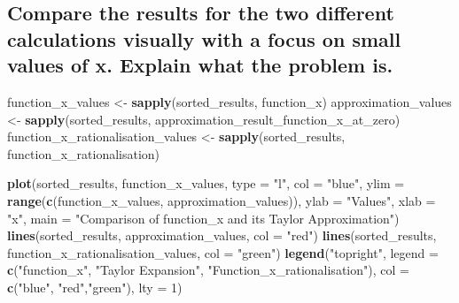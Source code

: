 \documentclass[
]{article}
\newenvironment{Shaded}{\begin{snugshade}}{\end{snugshade}}
\newcommand{\AttributeTok}[1]{\textcolor[rgb]{0.13,0.29,0.53}{#1}}
\newcommand{\DecValTok}[1]{\textcolor[rgb]{0.00,0.00,0.81}{#1}}
\newcommand{\FunctionTok}[1]{\textcolor[rgb]{0.13,0.29,0.53}{\textbf{#1}}}
\newcommand{\NormalTok}[1]{#1}
\newcommand{\OtherTok}[1]{\textcolor[rgb]{0.56,0.35,0.01}{#1}}
\newcommand{\StringTok}[1]{\textcolor[rgb]{0.31,0.60,0.02}{#1}}
\begin{document}
\subsection{Compare the results for the two different calculations
visually with a focus on small values of x. Explain what the problem
is.}\label{compare-the-results-for-the-two-different-calculations-visually-with-a-focus-on-small-values-of-x.-explain-what-the-problem-is.}

\begin{Shaded}
\begin{Highlighting}[]
\NormalTok{function\_x\_values }\OtherTok{\textless{}{-}} \FunctionTok{sapply}\NormalTok{(sorted\_results, function\_x)}
\NormalTok{approximation\_values }\OtherTok{\textless{}{-}} \FunctionTok{sapply}\NormalTok{(sorted\_results, approximation\_result\_function\_x\_at\_zero)}
\NormalTok{function\_x\_rationalisation\_values }\OtherTok{\textless{}{-}} \FunctionTok{sapply}\NormalTok{(sorted\_results, function\_x\_rationalisation)}

\FunctionTok{plot}\NormalTok{(sorted\_results, function\_x\_values, }\AttributeTok{type =} \StringTok{"l"}\NormalTok{, }\AttributeTok{col =} \StringTok{"blue"}\NormalTok{, }\AttributeTok{ylim =} \FunctionTok{range}\NormalTok{(}\FunctionTok{c}\NormalTok{(function\_x\_values, approximation\_values)), }\AttributeTok{ylab =} \StringTok{"Values"}\NormalTok{, }\AttributeTok{xlab =} \StringTok{"x"}\NormalTok{, }\AttributeTok{main =} \StringTok{"Comparison of function\_x and its Taylor Approximation"}\NormalTok{)}
\FunctionTok{lines}\NormalTok{(sorted\_results, approximation\_values, }\AttributeTok{col =} \StringTok{"red"}\NormalTok{)}
\FunctionTok{lines}\NormalTok{(sorted\_results, function\_x\_rationalisation\_values, }\AttributeTok{col =} \StringTok{"green"}\NormalTok{)}
\FunctionTok{legend}\NormalTok{(}\StringTok{"topright"}\NormalTok{, }\AttributeTok{legend =} \FunctionTok{c}\NormalTok{(}\StringTok{"function\_x"}\NormalTok{, }\StringTok{"Taylor Expansion"}\NormalTok{, }\StringTok{"Function\_x\_rationalisation"}\NormalTok{), }\AttributeTok{col =} \FunctionTok{c}\NormalTok{(}\StringTok{"blue"}\NormalTok{, }\StringTok{"red"}\NormalTok{,}\StringTok{"green"}\NormalTok{), }\AttributeTok{lty =} \DecValTok{1}\NormalTok{)}
\end{Highlighting}
\end{Shaded}
\end{document}
